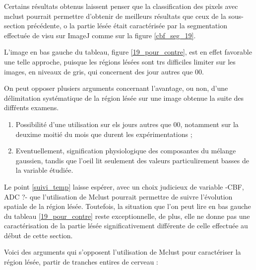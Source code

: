 
Certains r\'esultats obtenus laissent penser que la classification des pixels avec mclust pourrait permettre d'obtenir de meilleurs r\'esultats que ceux de la sous-section pr\'ec\'edente, %
o la partie l\'es\'ee \'etait caract\'eris\'ee par la segmentation effectu\'ee de visu sur ImageJ comme sur la figure \ref{cbf_seg_19}.

\par
L'image en bas  gauche du tableau, figure \ref{19_pour_contre}, est en effet favorable  une telle approche, %
puisque les r\'egions l\'es\'ees sont trs difficiles  limiter sur les images, en niveaux de gris, qui concernent des jour autres que 00.

\par
On peut opposer plusiers arguments concernant l'avantage, ou non, %
d'une d\'elimitation syst\'ematique de la r\'egion l\'es\'ee sur une image obtenue  la suite des diff\'rents examens.
\begin{enumerate}[label=\textbf{(Pour\arabic*)}]
\item\label{19_suivi_temp} Possibilit\'e d'une utilisation sur els jours autres que 00, notamment sur la deuxime moiti\'e du mois que durent les exp\'erimentations ;
\item\label{phy_gau} Eventuellement, signification physiologique des composantes du m\'elange gaussien, %
tandis que l'oeil lit seulement des valeurs particulirement basses de la variable \'etudi\'ee.
\end{enumerate}

Le point \ref{suivi_temp} laisse esp\'erer, avec un choix judicieux de variable -CBF, ADC ?- %
que l'utilisation de Mclust pourrait permettre de suivre l'\'evolution spatiale de la r\'egion l\'es\'ee. %
Toutefois, la situation que l'on peut lire en bas  gauche du tableau \ref{19_pour_contre} reste exceptionnelle, %
de plus, elle ne donne pas une caract\'erisation de la partie l\'es\'ee significativement diff\'erente de celle effectu\'ee au d\'ebut de cette section.

\etoile
Voici des arguments qui s'opposent  l'utilisation de Mclust pour caract\'eriser la r\'egion l\'es\'ee,  partir de tranches entires de cerveau :

